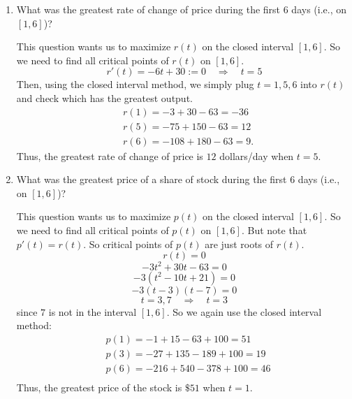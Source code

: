 \documentclass[nooutcomes]{ximera}
\begin{document}
\begin{problem}
\begin{enumerate}
		
		
	
	\item  What was the greatest rate of change of price during the first $6$ days (i.e., on $[1,6]$)?  
		\begin{freeResponse}
		This question wants us to maximize $r(t)$ on the closed interval $[1,6]$.  
		So we need to find all critical points of $r(t)$ on $[1,6]$.  
		$$ r'(t) = -6t+30:=0 \quad \Longrightarrow \quad t=5  $$
		Then, using the closed interval method, we simply plug $t=1,5,6$ into $r(t)$ and check which has the greatest output.  
			\begin{align*}
			&r(1) = -3+30-63=-36  \\
			&r(5) = -75+150-63=12  \\
			&r(6) = -108+180-63=9.
			\end{align*}
		Thus, the greatest rate of change of price is $12$ dollars/day when $t=5$.  
		\end{freeResponse}
		
		
		
	
	\item  What was the greatest price of a share of stock during the first $6$ days (i.e., on $[1,6]$)?  
		\begin{freeResponse}
		This question wants us to maximize $p(t)$ on the closed interval $[1,6]$.  
		So we need to find all critical points of $p(t)$ on $[1,6]$. 
		But note that $p'(t) = r(t)$.  So critical points of $p(t)$ are just roots of $r(t)$.  
		$$ r(t) = 0 $$
		$$ -3t^2+30t-63 = 0 $$
		$$ -3(t^2-10t+21)=0 $$
		$$ -3(t-3)(t-7) = 0 $$
		$$ t=3,7 \quad \Longrightarrow \quad t=3 $$
		since $7$ is not in the interval $[1,6]$.  
		So we again use the closed interval method:
			\begin{align*}
			&p(1) = -1+15-63+100 = 51  \\
			&p(3) = -27 + 135 - 189 + 100 = 19  \\
			&p(6) = -216+540-378+100=46  \\
			\end{align*}
		Thus, the greatest price of the stock is $\$51$ when $t=1$.  
		\end{freeResponse}
		
		
		
	
	\end{enumerate}


\end{problem}



	
	
	
	
\end{document}
